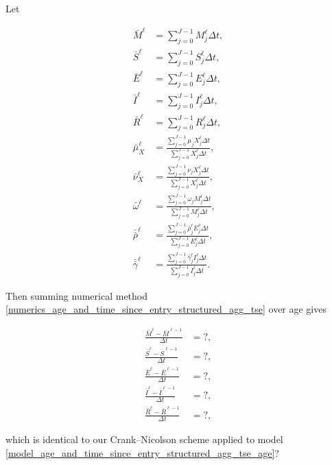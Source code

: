 \documentclass{jpmarticle}
\let\subequationsorig\subequations%
\let\endsubequationsorig\endsubequations%
\renewenvironment{subequations}{
  \subequationsorig
  \renewcommand{\theequation}{\theparentequation.\arabic{equation}}
}{
  \endsubequationsorig
}
\begin{document}
Let
\begin{subequations}
  \begin{align}
    \bar{M}^{\ell} &= \sum_{j = 0}^{J - 1} M_j^{\ell} \Delta t,
    \\
    \bar{S}^{\ell} &= \sum_{j = 0}^{J - 1} S_j^{\ell} \Delta t,
    \\
    \bar{E}^{\ell} &= \sum_{j = 0}^{J - 1} E_j^{\ell} \Delta t,
    \\
    \bar{I}^{\ell} &= \sum_{j = 0}^{J - 1} I_j^{\ell} \Delta t,
    \\
    \bar{R}^{\ell} &= \sum_{j = 0}^{J - 1} R_j^{\ell} \Delta t,
    \\
    \bar{\mu}_X^{\ell}
    &= \frac{\sum_{j = 0}^{J - 1} \mu_j X_j^{\ell} \Delta t}
    {\sum_{j = 0}^{J - 1} X_j^{\ell} \Delta t},
    \\
    \bar{\nu}_X^{\ell}
    &= \frac{\sum_{j = 0}^{J - 1} \nu_j X_j^{\ell} \Delta t}
    {\sum_{j = 0}^{J - 1} X_j^{\ell} \Delta t},
    \\
    \bar{\omega}^{\ell}
    &= \frac{\sum_{j = 0}^{J - 1} \omega_j M_j^{\ell} \Delta t}
    {\sum_{j = 0}^{J - 1} M_j^{\ell} \Delta t},
    \\
    \bar{\bar{\rho}}^{\ell}
    &= \frac{\sum_{j = 0}^{J - 1} \bar{\rho}_j^{\ell} E_j^{\ell} \Delta t}
    {\sum_{j = 0}^{J - 1} E_j^{\ell} \Delta t},
    \\
    \bar{\bar{\gamma}}^{\ell}
    &= \frac{\sum_{j = 0}^{J - 1} \bar{\gamma}_j^{\ell} I_j^{\ell} \Delta t}
    {\sum_{j = 0}^{J - 1} I_j^{\ell} \Delta t}.
  \end{align}
\end{subequations}
Then summing numerical method
\eqref{numerics_age_and_time_since_entry_structured_agg_tse} over
age gives
\begin{subequations}
  \label{numerics_age_and_time_since_entry_structured_agg_tse_age}
  \begin{align}
    \frac{\bar{M}^{\ell} - \bar{M}^{\ell - 1}}{\Delta t}
    &= ?,
    \\
    \frac{\bar{S}^{\ell} - \bar{S}^{\ell - 1}}{\Delta t}
    &= ?,
    \\
    \frac{\bar{E}^{\ell} - \bar{E}^{\ell - 1}}{\Delta t}
    &= ?,
    \\
    \frac{\bar{I}^{\ell} - \bar{I}^{\ell - 1}}{\Delta t}
    &= ?,
    \\
    \frac{\bar{R}^{\ell} - \bar{R}^{\ell - 1}}{\Delta t}
    &= ?,
  \end{align}
\end{subequations}
which is identical to our Crank--Nicolson scheme applied to model
\eqref{model_age_and_time_since_entry_structured_agg_tse_age}?
\end{document}
